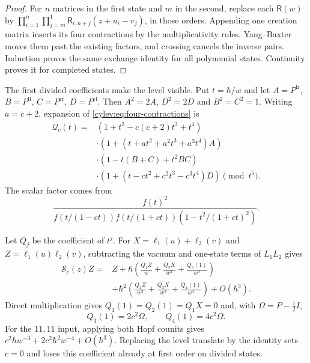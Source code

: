 \begin{proof}
For $n$ matrices in the first state and $m$ in the second, replace
each $\mathsf R(w)$ by
$\prod_{i=1}^{n}\prod_{j=m}^{1}
\mathsf R_{i,n+j}(z+u_i-v_j)$, in those orders.
Appending one creation matrix inserts its four contractions by
the multiplicativity rules. Yang--Baxter moves them past the
existing factors, and crossing cancels the inverse pairs.
Induction proves the same exchange identity for all polynomial
states. Continuity proves it for completed states.
\end{proof}

The first divided coefficients make the level visible.
Put $t=\hbar/w$ and let
$A=P^{\mathrm{lr}}$, $B=P^{\mathrm{ll}}$,
$C=P^{\mathrm{rr}}$, $D=P^{\mathrm{rl}}$.
Then $A^2=2A$, $D^2=2D$ and $B^2=C^2=1$.
Writing $a=c+2$, expansion of \eqref{cylev:eq:four-contractions} is
\begin{equation}\label{cylev:eq:fourth-order}
\begin{split}
 \mathcal Q_c(t)={}&(1+t^2-c(c+2)t^3+t^4)\\
 &\cdot(1+(t+at^2+a^2t^3+a^3t^4)A)\\
 &\cdot(1-t(B+C)+t^2BC)\\
 &\cdot(1+(t-ct^2+c^2t^3-c^3t^4)D)\pmod{t^5}.
\end{split}
\end{equation}
The scalar factor comes from
\[
 \frac{f(t)^2}
 {f(t/(1-ct))f(t/(1+ct))(1-t^2/(1+ct)^2)}.
\]

Let $Q_j$ be the coefficient of $t^j$.
For $X=\ell_1(u)+\ell_2(v)$ and $Z=\ell_1(u)\ell_2(v)$,
subtracting the vacuum and one-state terms of $L_1L_2$ gives
\begin{equation}\label{cylev:eq:divided-exchange}
\begin{split}
 \mathcal S_c(z)Z={}&Z+
 \hbar\left(\frac{Q_1Z}{w}+\frac{Q_2X}{w^2}+\frac{Q_3(1)}{w^3}\right)\\
 &+\hbar^2\left(\frac{Q_2Z}{w^2}+\frac{Q_3X}{w^3}
                                      +\frac{Q_4(1)}{w^4}\right)
       +O(\hbar^3).
\end{split}
\end{equation}
Direct multiplication gives $Q_1(1)=Q_2(1)=Q_1X=0$ and, with
$\Omega=P-\tfrac12I$,
\begin{equation}\label{cylev:eq:vacuum-coefficients}
 Q_3(1)=2c^2\Omega,\qquad Q_4(1)=4c^2\Omega.
\end{equation}
For the $11,11$ input, applying both Hopf counits gives
$c^2\hbar w^{-3}+2c^2\hbar^2w^{-4}+O(\hbar^3)$.
Replacing the level translate by the identity sets $c=0$ and loses
this coefficient already at first order on divided states.

